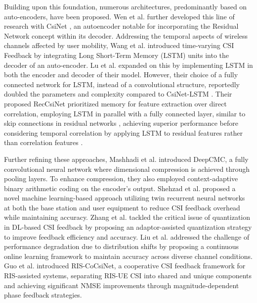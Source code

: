 \documentclass[lettersize,journal]{IEEEtran}
\begin{document}
Building upon this foundation, numerous architectures, predominantly based on auto-encoders, have been proposed. Wen et al. further developed this line of research with CsiNet \cite{abe}, an autoencoder notable for incorporating the Residual Network concept \cite{abg} within its decoder. Addressing the temporal aspects of wireless channels affected by user mobility, Wang et al. \cite{abh} introduced time-varying CSI Feedback by integrating Long Short-Term Memory (LSTM) units into the decoder of an auto-encoder. Lu et al. \cite{abi} expanded on this by implementing LSTM in both the encoder and decoder of their model. However, their choice of a fully connected network for LSTM, instead of a convolutional structure, reportedly doubled the parameters and complexity compared to CsiNet-LSTM \cite{abh}. Their proposed RecCsiNet \cite{abi} prioritized memory for feature extraction over direct correlation, employing LSTM in parallel with a fully connected layer, similar to skip connections in residual networks \cite{abi}, achieving superior performance before considering temporal correlation by applying LSTM to residual features rather than correlation features \cite{abh}.

Further refining these approaches, Mashhadi et al. \cite{mashhadi2020deepcmc} introduced DeepCMC, a fully convolutional neural network where dimensional compression is achieved through pooling layers. To enhance compression, they also employed context-adaptive binary arithmetic coding on the encoder's output. Shehzad et al. \cite{shehzad2021design} proposed a novel machine learning-based approach utilizing twin recurrent neural networks at both the base station and user equipment to reduce CSI feedback overhead while maintaining accuracy. Zhang et al. \cite{zhang2022quantization} tackled the critical issue of quantization in DL-based CSI feedback by proposing an adaptor-assisted quantization strategy to improve feedback efficiency and accuracy. Liu et al. \cite{liu2023continuous} addressed the challenge of performance degradation due to distribution shifts by proposing a continuous online learning framework to maintain accuracy across diverse channel conditions. Guo et al. \cite{guo2023ris} introduced RIS-CoCsiNet, a cooperative CSI feedback framework for RIS-assisted systems, separating RIS-UE CSI into shared and unique components and achieving significant NMSE improvements through magnitude-dependent phase feedback strategies.
\end{document}
